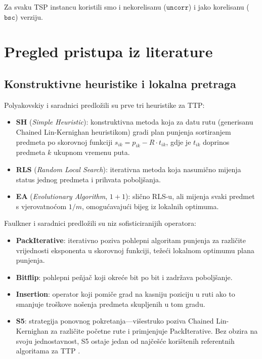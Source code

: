 \documentclass[12pt,a4paper]{article}
\begin{document}
Za svaku TSP instancu koristili smo i nekorelisanu ($\texttt{uncorr}$) i jako korelisanu ($\texttt{bsc}$) verziju.

\section{Pregled pristupa iz literature}

\subsection{Konstruktivne heuristike i lokalna pretraga}

Polyakovskiy i saradnici \cite{polyakovskiy2014} predlo\v{z}ili su prve tri heuristike za TTP:
\begin{itemize}
    \item \textbf{SH} (\textit{Simple Heuristic}): konstruktivna metoda koja za datu rutu (generisanu Chained Lin-Kernighan heuristikom) gradi plan punjenja sortiranjem predmeta po skorovnoj funkciji $s_{ik} = p_{ik} - R \cdot t_{ik}$, gdje je $t_{ik}$ doprinos predmeta $k$ ukupnom vremenu puta.
    \item \textbf{RLS} (\textit{Random Local Search}): iterativna metoda koja nasumi\v{c}no mijenja status jednog predmeta i prihvata pobolj\v{s}anja.
    \item \textbf{EA} (\textit{Evolutionary Algorithm}, $1+1$): sli\v{c}no RLS-u, ali mijenja svaki predmet s vjerovatno\'{c}om $1/m$, omogu\'{c}avaju\'{c}i bijeg iz lokalnih optimuma.
\end{itemize}

Faulkner i saradnici \cite{faulkner2015} predlo\v{z}ili su niz sofisticiranijih operatora:
\begin{itemize}
    \item \textbf{PackIterative}: iterativno poziva pohlepni algoritam punjenja za razli\v{c}ite vrijednosti eksponenta u skorovnoj funkciji, te\v{z}e\'{c}i lokalnom optimumu plana punjenja.
    \item \textbf{Bitflip}: pohlepni pe\v{n}ja\v{c} koji okre\'{c}e bit po bit i zadr\v{z}ava poboljšanje.
    \item \textbf{Insertion}: operator koji pomi\v{c}e grad na kasniju poziciju u ruti ako to smanjuje troškove no\v{s}enja predmeta skupljenih u tom gradu.
    \item \textbf{S5}: strategija ponovnog pokretanja---vi\v{s}estruko poziva Chained Lin-Kernighan za razli\v{c}ite po\v{c}etne rute i primjenjuje PackIterative. Bez obzira na svoju jednostavnost, S5 ostaje jedan od naj\v{c}e\v{s}\'{c}e kori\v{s}tenih referentnih algoritama za TTP \cite{wagner_selection}.
\end{itemize}
\end{document}
